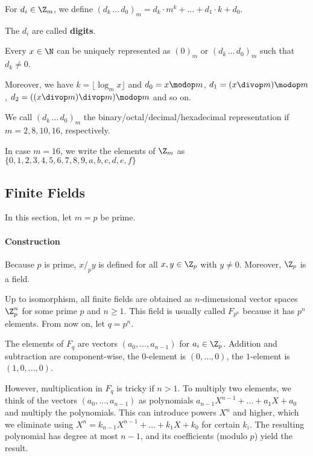 \begin{definition}\label{def:math:base}
For $d_i\in\Z_m$, we define $(d_k\,\ldots\,d_0)_m =d_k\cdot m^k+\ldots+d_1\cdot k+d_0$.

The $d_i$ are called \textbf{digits}.
\end{definition}

\begin{theorem}\label{thm:math:base}
Every $x\in\N$ can be uniquely represented as $(0)_m$ or $(d_k\,\ldots\,d_0)_m$ such that $d_k\neq 0$.

Moreover, we have $k=\lfloor \log_m x \rfloor$ and  $d_0=x\modop m$, $d_1=(x\divop m)\modop m$, $d_2=((x\divop m)\divop m)\modop m$ and so on.
\end{theorem}

\begin{example}
We call $(d_k\,\ldots\,d_0)_m$ the binary/octal/decimal/hexadecimal representation if $m=2,8,10,16$, respectively.

In case $m=16$, we write the elements of $\Z_m$ as $\{0,1,2,3,4,5,6,7,8,9,a,b,c,d,e,f\}$
\end{example}

\subsection{Finite Fields}\label{sec:math:finfield}

In this section, let $m=p$ be prime.

\paragraph{Construction}
Because $p$ is prime, $x/_p y$ is defined for all $x,y\in\Z_p$ with $y\neq 0$.
Moreover, $\Z_p$ is a field.

Up to isomorphism, all finite fields are obtained as $n$-dimensional vector spaces $\Z_p^n$ for some prime $p$ and $n\geq 1$.
This field is usually called $F_{p^n}$ because it has $p^n$ elements.
From now on, let $q=p^n$.

The elements of $F_q$ are vectors $(a_0,\ldots,a_{n-1})$ for $a_i\in\Z_p$.
Addition and subtraction are component-wise, the $0$-element is $(0,\ldots,0)$, the $1$-element is $(1,0,\ldots,0)$.

However, multiplication in $F_q$ is tricky if $n>1$.
To multiply two elements, we think of the vectors $(a_0,\ldots,a_{n-1})$ as polynomials $a_{n-1}X^{n-1}+\ldots+a_1X+a_0$ and multiply the polynomials.
This can introduce powers $X^n$ and higher, which we eliminate using $X^n=k_{n-1}X^{n-1}+\ldots+k_1X+k_0$ for certain $k_i$.
The resulting polynomial has degree at most $n-1$, and its coefficients (modulo $p$) yield the result.

